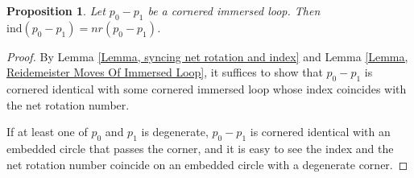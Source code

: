 \documentclass{amsart}
\newtheorem{prop}[thm]{Proposition}
\theoremstyle{definition}
\theoremstyle{remark}
\numberwithin{equation}{section}
\numberwithin{equation}{section} \makeatletter
\begin{document}
\begin{prop}\label{Proposition, index equals to net rotation}
Let $p_0-p_1$ be a cornered immersed loop. Then $\text{ind}(p_0-p_1)=nr(p_0-p_1)$.
\end{prop}
\begin{proof}
By Lemma \ref{Lemma, syncing net rotation and index} and Lemma \ref{Lemma, Reidemeister Moves Of Immersed Loop}, it suffices to show that $p_0-p_1$ is cornered identical with some cornered immersed loop whose index coincides with the net rotation number.

If at least one of $p_0$ and $p_1$ is degenerate, $p_0-p_1$ is cornered identical with an embedded circle that passes the corner, and it is easy to see the index and the net rotation number coincide on an embedded circle with a degenerate corner. 


\end{proof}
\end{document}
